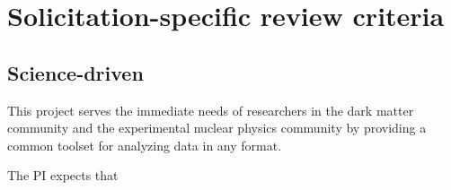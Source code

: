



\section{Solicitation-specific review criteria}
\subsection{Science-driven}

This project serves the immediate needs of researchers in the dark matter community and the experimental nuclear physics community by providing a common toolset for analyzing data in any format.

The PI expects that

